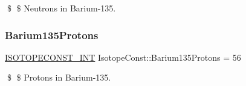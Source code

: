\$ \$ Neutrons in Barium-\/135. \mbox{\label{group___isotope_const-_barium-_ba135_ga487c9bfce0d2317bba0d5cec487714af}} 
\subsubsection{\texorpdfstring{Barium135\+Protons}{Barium135Protons}}
{\footnotesize\ttfamily \mbox{\hyperlink{group___isotope_const-_macros_ga5f18360b3e99483a35c32d789e62621c}{I\+S\+O\+T\+O\+P\+E\+C\+O\+N\+S\+T\+\_\+\+I\+NT}} Isotope\+Const\+::\+Barium135\+Protons = 56}

\$ \$ Protons in Barium-\/135. 